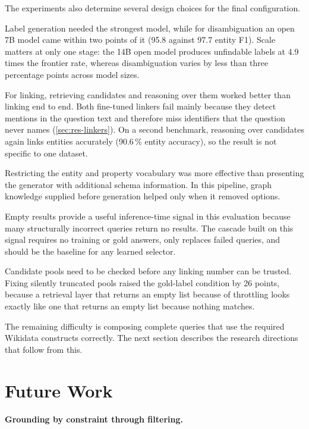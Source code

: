 \label{sec:conclusion-system}

The experiments also determine several design choices for the final configuration.

Label generation needed the strongest model, while for disambiguation an open 7B model came within two points of it (95.8 against 97.7 entity F1).
Scale matters at only one stage: the 14B open model produces unfindable labels at 4.9 times the frontier rate, whereas disambiguation varies by less than three percentage points across model sizes.

For linking, retrieving candidates and reasoning over them worked better than linking end to end.
Both fine-tuned linkers fail mainly because they detect mentions in the question text and therefore miss identifiers that the question never names (\cref{sec:res-linkers}).
On a second benchmark, reasoning over candidates again links entities accurately (90.6\,\% entity accuracy), so the result is not specific to one dataset.

Restricting the entity and property vocabulary was more effective than presenting the generator with additional schema information.
In this pipeline, graph knowledge supplied before generation helped only when it removed options.

Empty results provide a useful inference-time signal in this evaluation because many structurally incorrect queries return no results.
The cascade built on this signal requires no training or gold answers, only replaces failed queries, and should be the baseline for any learned selector.

Candidate pools need to be checked before any linking number can be trusted.
Fixing silently truncated pools raised the gold-label condition by 26 points, because a retrieval layer that returns an empty list because of throttling looks exactly like one that returns an empty list because nothing matches.

The remaining difficulty is composing complete queries that use the required Wikidata constructs correctly.
The next section describes the research directions that follow from this.

\section{Future Work}

\label{sec:future-work}

\paragraph{Grounding by constraint through
filtering.}

